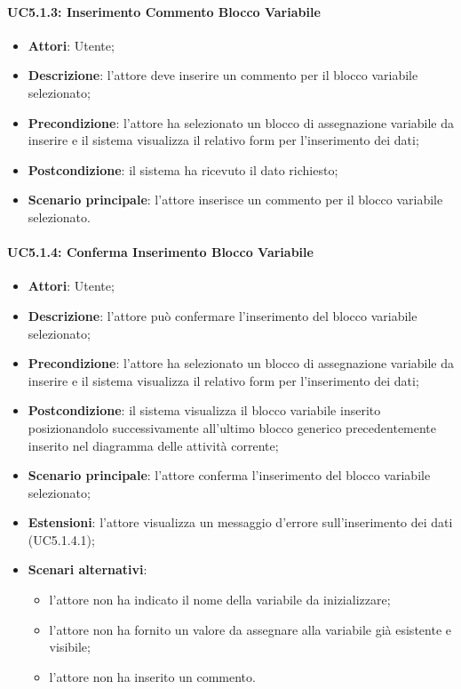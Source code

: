 \paragraph{UC5.1.3: Inserimento Commento Blocco Variabile}
\label{UC5.1.3}
\begin{itemize}
	\item \textbf{Attori}: Utente;
	\item \textbf{Descrizione}: l'attore deve inserire un commento per il blocco variabile selezionato;
	\item \textbf{Precondizione}: l'attore ha selezionato un blocco di assegnazione variabile da inserire e il sistema visualizza il relativo form per l'inserimento dei dati;
	\item \textbf{Postcondizione}: il sistema ha ricevuto il dato richiesto;
	\item \textbf{Scenario principale}: l'attore inserisce un commento per il blocco variabile selezionato.
\end{itemize}

\paragraph{UC5.1.4: Conferma Inserimento Blocco Variabile}
\label{UC5.1.4}
\begin{itemize}
	\item \textbf{Attori}: Utente;
	\item \textbf{Descrizione}: l'attore può confermare l'inserimento del blocco variabile selezionato;
	\item \textbf{Precondizione}: l'attore ha selezionato un blocco di assegnazione variabile da inserire e il sistema visualizza il relativo form per l'inserimento dei dati;
	\item \textbf{Postcondizione}: il sistema visualizza il blocco variabile inserito posizionandolo successivamente all'ultimo blocco generico precedentemente inserito nel diagramma delle attività corrente;
	\item \textbf{Scenario principale}: l'attore conferma l'inserimento del blocco variabile selezionato;
	\item \textbf{Estensioni}: l'attore visualizza un messaggio d'errore sull'inserimento dei dati (UC5.1.4.1);
	\item \textbf{Scenari alternativi}:
	\begin{itemize}
		\item l'attore non ha indicato il nome della variabile da inizializzare;
		\item l'attore non ha fornito un valore da assegnare alla variabile già esistente e visibile;
		\item l'attore non ha inserito un commento.
	\end{itemize}
\end{itemize}

